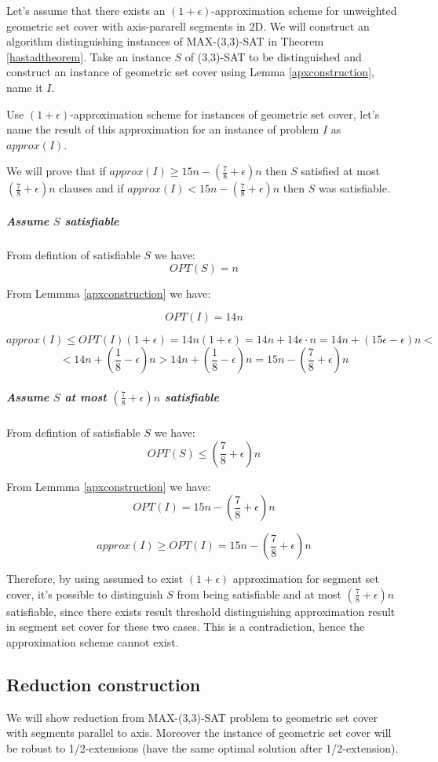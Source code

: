 Let's assume that there exists an $(1+\epsilon)$-approximation scheme
for unweighted geometric set cover with axis-pararell segments in 2D.
We will construct an algorithm distinguishing instances of
MAX-(3,3)-SAT
in Theorem \ref{hastadtheorem}.
Take an instance $S$ of (3,3)-SAT to be distinguished
and construct an instance of geometric set cover
using Lemma \ref{apxconstruction}, name it $I$.

Use $(1+\epsilon)$-approximation scheme for instances of geometric
set cover, let's name the result of this approximation
for an instance of problem $I$ as $approx(I)$.

We will prove that 
if $approx(I) \ge 15n - (\frac{7}{8} + \epsilon)n$ then $S$
satisfied at most $(\frac{7}{8}+\epsilon)n$ clauses
and if $approx(I) < 15n - (\frac{7}{8} + \epsilon)n$ then $S$ was
satisfiable.

\subparagraph{Assume $S$ satisfiable}
From defintion of satisfiable $S$ we have:
$$OPT(S) = n$$

From Lemmma \ref{apxconstruction} we have:

$$OPT(I) = 14n$$

$$approx(I) \le OPT(I)(1+\epsilon) = 14n(1+\epsilon)
	= 14n + 14\epsilon\cdot n = 14n + (15\epsilon - \epsilon)n < $$
$$ < 14n + (\frac{1}{8} - \epsilon)n >
14n + (\frac{1}{8} - \epsilon)n = 15n - (\frac{7}{8} + \epsilon)n$$

\subparagraph{Assume $S$ at most $(\frac{7}{8} + \epsilon)n$ satisfiable}
From defintion of satisfiable $S$ we have:
$$OPT(S) \le (\frac{7}{8} + \epsilon)n$$

From Lemmma \ref{apxconstruction} we have:
$$OPT(I) = 15n - (\frac{7}{8} + \epsilon)n$$

$$approx(I) \ge OPT(I) = 15n - (\frac{7}{8} + \epsilon)n$$


Therefore, by using assumed to exist $(1+\epsilon)$ approximation
for segment set cover,
it’s possible to distinguish $S$ from
being satisfiable and at most $(\frac{7}{8} + \epsilon)n$ satisfiable,
since there exists result threshold distinguishing
approximation result in segment set cover for these two cases.
This is a contradiction, hence the approximation scheme cannot exist.

\subsection{Reduction construction}
We will show reduction from MAX-(3,3)-SAT problem
to geometric set cover with segments
parallel to axis. Moreover the instance
of geometric set cover will be robust
to 1/2-extensions (have the same optimal solution
after 1/2-extension).

